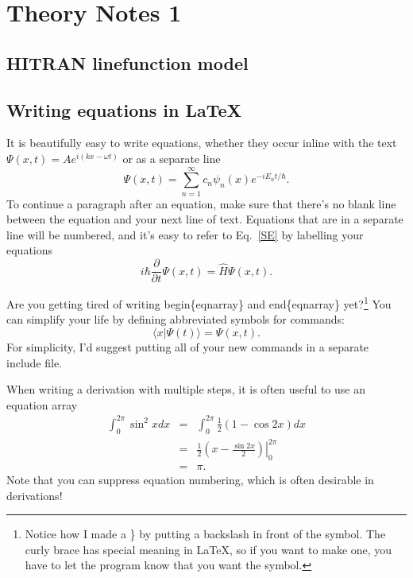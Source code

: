 \documentclass[../main]{subfiles}
\begin{document}
\chapter{Theory Notes 1}
\section{HITRAN linefunction model}







\section{Writing equations in \LaTeX}
It is beautifully easy to write equations, whether they occur inline with the text  $\Psi(x,t) = A e^{i(kx -\omega t)}$ or as a separate line
\begin{equation}
\Psi(x,t) =\sum_{n=1}^\infty c_n \psi_n(x) e^{-i E_n t/\hbar}.
\end{equation}
To continue a paragraph after an equation, make sure that there's no blank line between the equation and your next line of text.
Equations that are in a separate line will be numbered, and it's easy to refer to Eq.~\ref{SE} by labelling your equations  
\begin{equation}
i\hbar\frac{\partial}{\partial t}\Psi(x,t) = \hat{H} \Psi(x,t). 
\label{SE}
\end{equation}

Are you getting tired of writing begin\{eqnarray\} and end\{eqnarray\} yet?\footnote{Notice how I made a \} by putting a backslash in front of the symbol.  The curly brace has special meaning in \LaTeX, so if you want to make one, you have to let the program know that you want the symbol.}  You can simplify your life by defining abbreviated symbols for commands:
\newcommand{\beq}{\begin{equation}}
\newcommand{\eeq}{\end{equation}}
\beq
\langle x |\Psi(t)\rangle = \Psi(x,t).
\eeq
For simplicity, I'd suggest putting all of your new commands in a separate include file.

When writing a derivation with multiple steps, it is often useful to use an equation array
\begin{eqnarray}
\int_0^{2\pi}\sin^2{x}dx & = &  \int_0^{2\pi}\frac{1}{2}\left(1-\cos{2x}\right)dx \nonumber \\
& = & \left. \frac{1}{2}\left(x - \frac{\sin{2x}}{2}\right)\right|_0^{2\pi} \nonumber \\
& = & \pi. \nonumber 
\end{eqnarray}
Note that you can suppress equation numbering, which is often desirable in derivations!
\end{document}
